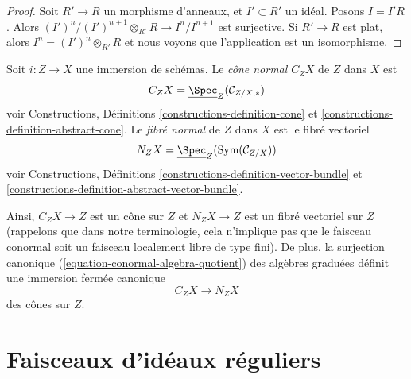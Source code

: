 \begin{proof}
Soit  $R' \to R$  un morphisme d'anneaux, et  $I' \subset R'$  un idéal. Posons
 $I = I'R$. Alors  $(I')^n/(I')^{n + 1} \otimes_{R'} R \to I^n/I^{n + 1}$  est surjective. Si  $R' \to R$  est plat, alors
 $I^n = (I')^n \otimes_{R'} R$  et nous voyons que l'application est un isomorphisme.
\end{proof}

\begin{definition}
\label{definition-normal-cone}
Soit  $i : Z \to X$  une immersion de schémas. Le {\it cône normal
 $C_ZX$}  de  $Z$  dans
 $X$  est
$$
C_ZX = \underline{\Spec}_Z(\mathcal{C}_{Z/X, *})
$$
voir Constructions, Définitions  \ref{constructions-definition-cone}  et  \ref{constructions-definition-abstract-cone}. Le {\it fibré normal}
de  $Z$  dans  $X$  est le
fibré vectoriel
$$
N_ZX = \underline{\Spec}_Z(\text{Sym}(\mathcal{C}_{Z/X}))
$$
voir Constructions, Définitions  \ref{constructions-definition-vector-bundle}  et  \ref{constructions-definition-abstract-vector-bundle}.
\end{definition}

\noindent
Ainsi,  $C_ZX \to Z$  est un cône sur  $Z$  et  $N_ZX \to Z$  est un fibré
vectoriel sur  $Z$  (rappelons que dans notre terminologie, cela n'implique
pas que le faisceau conormal soit un faisceau localement libre de type fini). De
plus, la surjection canonique (\ref{equation-conormal-algebra-quotient}) des algèbres graduées définit une
immersion fermée canonique
\begin{equation}
\label{equation-normal-cone-in-normal-bundle}
C_ZX \longrightarrow N_ZX
\end{equation}
des cônes sur  $Z$.





\section{Faisceaux d'idéaux réguliers}
\label{section-regular-ideal-sheaves}

